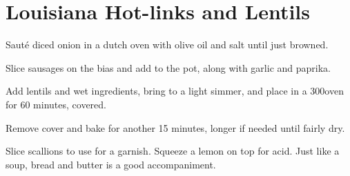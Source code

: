 
\section{Louisiana Hot-links and Lentils}


\begin{recipe}


Sauté diced onion in a dutch oven with olive oil and salt until just browned.


Slice sausages on the bias and add to the pot, along with garlic and paprika.


Add lentils and wet ingredients, bring to a light simmer, and place in a
300\degree oven for 60 minutes, covered.


Remove cover and bake for another 15 minutes, longer if needed until fairly dry.


Slice scallions to use for a garnish. Squeeze a lemon on top for acid.
Just like a soup, bread and butter is a good accompaniment.

\end{recipe}
